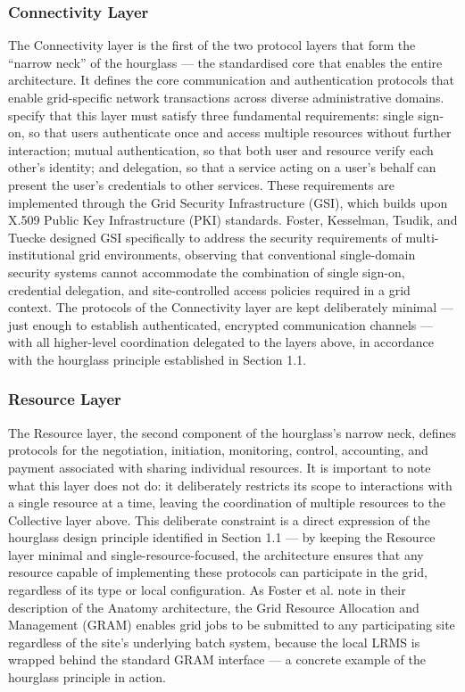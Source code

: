 \documentclass[12pt,a4paper]{report}
\begin{document}
     \subsubsection{Connectivity Layer}
    The Connectivity layer is the first of the two protocol layers that form the “narrow neck” of the hourglass — the standardised core 
     that enables the entire architecture. It defines the core communication and authentication protocols that enable grid-specific network
      transactions across diverse administrative domains. \parencite{foster2001} specify that this layer must satisfy three fundamental requirements: 
      single sign-on, so that users authenticate once and access multiple resources without further interaction; mutual authentication, 
     so that both user and resource verify each other’s identity; and delegation, so that a service acting on a user’s behalf can present 
      the user’s credentials to other services. These requirements are implemented through the Grid Security Infrastructure (GSI), which builds 
     upon X.509 Public Key Infrastructure (PKI) standards. Foster, Kesselman, Tsudik, and Tuecke \parencite{foster1998} designed GSI specifically to address 
     the security requirements of multi-institutional grid environments, observing that conventional single-domain security systems cannot 
  accommodate the combination of single sign-on, credential delegation, and site-controlled access policies required in a grid context. 
     The protocols of the Connectivity layer are kept deliberately minimal — just enough to establish authenticated, encrypted communication 
     channels — with all higher-level coordination delegated to the layers above, in accordance with the hourglass principle established in Section 1.1.

    \subsubsection{Resource Layer}
    The Resource layer, the second component of the hourglass’s narrow neck, defines protocols for the negotiation, initiation, monitoring, 
    control, accounting, and payment associated with sharing individual resources. It is important to note what this layer does not do: it
     deliberately restricts its scope to interactions with a single resource at a time, leaving the coordination of multiple resources to 
     the Collective layer above. This deliberate constraint is a direct expression of the hourglass design principle identified in Section 1.1 — by 
     keeping the Resource layer minimal and single-resource-focused, the architecture ensures that any resource capable of implementing these
      protocols can participate in the grid, regardless of its type or local configuration. As Foster et al. \parencite{foster2001} note in 
      their description of the Anatomy architecture, the Grid Resource Allocation and Management (GRAM) enables grid jobs to be submitted to any participating site regardless of the 
      site’s underlying batch system, because the local LRMS is wrapped behind the standard GRAM interface — a concrete example of the 
      hourglass principle in action.
\end{document}
